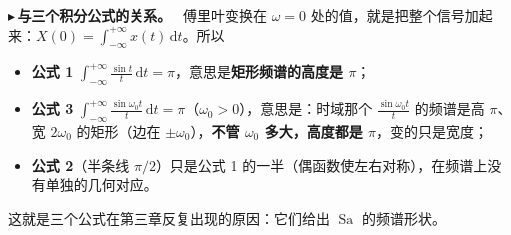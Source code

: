 \documentclass[UTF8,a4paper,11pt]{ctexart}
\newcommand{\Sa}{\operatorname{Sa}}
\renewcommand{\d}{\,\mathrm{d}}
\newcounter{ex}[section]
\newcommand{\point}[1]{\par\addvspace{1ex}\noindent\textcolor{ptteal}{$\blacktriangleright$\,\textbf{#1}}\ }
\renewcommand{\paragraph}[1]{\point{#1}}
\begin{document}
\paragraph{与三个积分公式的关系。}
傅里叶变换在 $\omega=0$ 处的值，就是把整个信号加起来：$X(0)=\int_{-\infty}^{+\infty}x(t)\d t$。所以
\begin{itemize}
\item \textbf{公式 1} $\displaystyle\int_{-\infty}^{+\infty}\frac{\sin t}{t}\d t=\pi$，意思是\textbf{矩形频谱的高度是 $\pi$}；
\item \textbf{公式 3} $\displaystyle\int_{-\infty}^{+\infty}\frac{\sin\omega_0t}{t}\d t=\pi$（$\omega_0>0$），意思是：时域那个 $\frac{\sin\omega_0t}{t}$ 的频谱是高 $\pi$、宽 $2\omega_0$ 的矩形（边在 $\pm\omega_0$），\textbf{不管 $\omega_0$ 多大，高度都是 $\pi$}，变的只是宽度；
\item \textbf{公式 2}（半条线 $\pi/2$）只是公式 1 的一半（偶函数使左右对称），在频谱上没有单独的几何对应。
\end{itemize}
这就是三个公式在第三章反复出现的原因：它们给出 $\Sa$ 的频谱形状。
\end{document}
